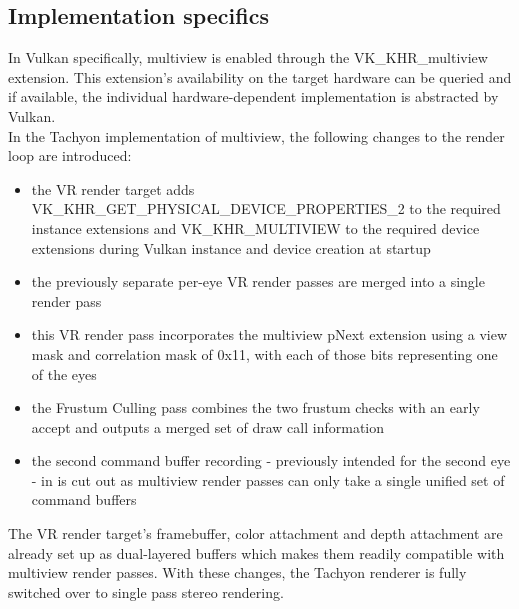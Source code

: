 \subsection{Implementation specifics}
In Vulkan specifically, multiview is enabled through the VK\_KHR\_multiview extension. This extension's availability on the target hardware can be queried and if available, the individual hardware-dependent implementation is abstracted by Vulkan. \\
In the Tachyon implementation of multiview, the following changes to the render loop are introduced: 
\begin{itemize}
\item the VR render target adds VK\_KHR\_GET\_PHYSICAL\_DEVICE\_PROPERTIES\_2 to the required instance extensions and VK\_KHR\_MULTIVIEW to the required device extensions during Vulkan instance and device creation at startup
\item the previously separate per-eye VR render passes are merged into a single render pass
\item this VR render pass incorporates the multiview pNext extension using a view mask and correlation mask of 0x11, with each of those bits representing one of the eyes
\item the Frustum Culling pass combines the two frustum checks with an early accept and outputs a merged set of draw call information
\item the second command buffer recording - previously intended for the second eye - in  is cut out as multiview render passes can only take a single unified set of command buffers
\end{itemize}
The VR render target's framebuffer, color attachment and depth attachment are already set up as dual-layered buffers which makes them readily compatible with multiview render passes. With these changes, the Tachyon renderer is fully switched over to single pass stereo rendering. 
